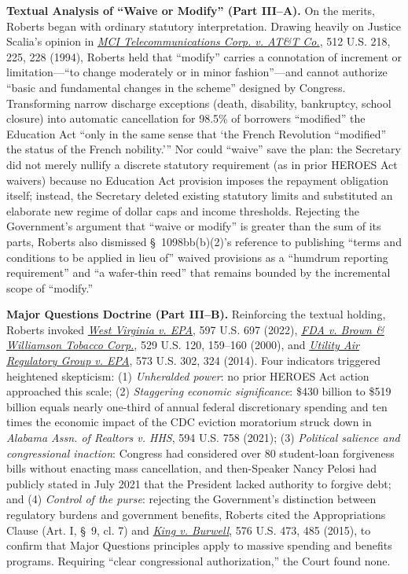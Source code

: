 \documentclass[12pt]{article}
\begin{document}
\textbf{Textual Analysis of ``Waive or Modify'' (Part III--A).} On the merits, Roberts began with ordinary statutory interpretation. Drawing heavily on Justice Scalia's opinion in \href{https://supreme.justia.com/cases/federal/us/512/218/}{\textit{MCI Telecommunications Corp. v. AT\&T Co.}}, 512 U.S. 218, 225, 228 (1994), Roberts held that ``modify'' carries a connotation of increment or limitation---``to change moderately or in minor fashion''---and cannot authorize ``basic and fundamental changes in the scheme'' designed by Congress. Transforming narrow discharge exceptions (death, disability, bankruptcy, school closure) into automatic cancellation for 98.5\% of borrowers ``modified'' the Education Act ``only in the same sense that `the French Revolution ``modified'' the status of the French nobility.''' Nor could ``waive'' save the plan: the Secretary did not merely nullify a discrete statutory requirement (as in prior HEROES Act waivers) because no Education Act provision imposes the repayment obligation itself; instead, the Secretary deleted existing statutory limits and substituted an elaborate new regime of dollar caps and income thresholds. Rejecting the Government's argument that ``waive or modify'' is greater than the sum of its parts, Roberts also dismissed \S~1098bb(b)(2)'s reference to publishing ``terms and conditions to be applied in lieu of'' waived provisions as a ``humdrum reporting requirement'' and ``a wafer-thin reed'' that remains bounded by the incremental scope of ``modify.''

\textbf{Major Questions Doctrine (Part III--B).} Reinforcing the textual holding, Roberts invoked \href{https://supreme.justia.com/cases/federal/us/597/20-1530/}{\textit{West Virginia v. EPA}}, 597 U.S. 697 (2022), \href{https://supreme.justia.com/cases/federal/us/529/120/}{\textit{FDA v. Brown \& Williamson Tobacco Corp.}}, 529 U.S. 120, 159--160 (2000), and \href{https://supreme.justia.com/cases/federal/us/573/302/}{\textit{Utility Air Regulatory Group v. EPA}}, 573 U.S. 302, 324 (2014). Four indicators triggered heightened skepticism: (1) \textit{Unheralded power}: no prior HEROES Act action approached this scale; (2) \textit{Staggering economic significance}: \$430 billion to \$519 billion equals nearly one-third of annual federal discretionary spending and ten times the economic impact of the CDC eviction moratorium struck down in \textit{Alabama Assn. of Realtors v. HHS}, 594 U.S. 758 (2021); (3) \textit{Political salience and congressional inaction}: Congress had considered over 80 student-loan forgiveness bills without enacting mass cancellation, and then-Speaker Nancy Pelosi had publicly stated in July 2021 that the President lacked authority to forgive debt; and (4) \textit{Control of the purse}: rejecting the Government's distinction between regulatory burdens and government benefits, Roberts cited the Appropriations Clause (Art. I, \S~9, cl. 7) and \href{https://supreme.justia.com/cases/federal/us/576/473/}{\textit{King v. Burwell}}, 576 U.S. 473, 485 (2015), to confirm that Major Questions principles apply to massive spending and benefits programs. Requiring ``clear congressional authorization,'' the Court found none.
\end{document}
